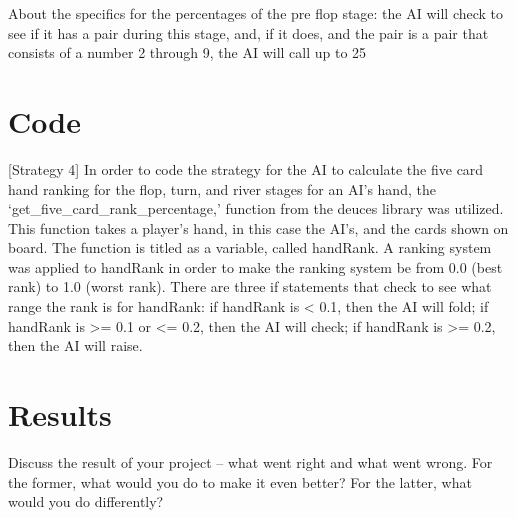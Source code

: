 \documentclass[10pt, a4paper, twocolumn]{article} %
\begin{document}
About the specifics for the percentages of the pre flop stage: the AI will check to see if it has a pair during this stage, and, if it does, and the pair is a pair that consists of a number 2 through 9, the AI will call up to 25%






\section{Code}

[Strategy 4] In order to code the strategy for the AI to calculate the five card hand ranking for the flop, turn, and river stages for an AI’s hand, the ‘get_five_card_rank_percentage,’ function from the deuces library was utilized. This function takes a player’s hand, in this case the AI’s, and the cards shown on board. The function is titled as a variable, called handRank. A ranking system was applied to handRank in order to make the ranking system be from 0.0 (best rank) to 1.0 (worst rank). There are three if statements that check to see what range the rank is for handRank: if handRank is < 0.1, then the AI will fold; if handRank is  >= 0.1 or <= 0.2, then the AI will check; if handRank is >= 0.2, then the AI will raise.




\section{Results}
Discuss the result of your project -- what went right and what went wrong.  For the former, what would you do to make it even better? For the latter, what would you do differently?
\end{document}
